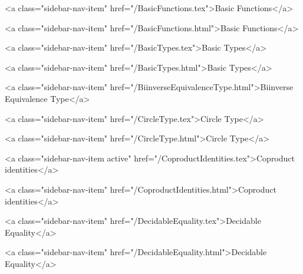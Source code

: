       
    
      
        
          <a class="sidebar-nav-item" href="/BasicFunctions.tex">Basic Functions</a>
        
      
    
      
        
          <a class="sidebar-nav-item" href="/BasicFunctions.html">Basic Functions</a>
        
      
    
      
        
          <a class="sidebar-nav-item" href="/BasicTypes.tex">Basic Types</a>
        
      
    
      
        
          <a class="sidebar-nav-item" href="/BasicTypes.html">Basic Types</a>
        
      
    
      
        
          <a class="sidebar-nav-item" href="/BiinverseEquivalenceType.html">Biinverse Equivalence Type</a>
        
      
    
      
        
          <a class="sidebar-nav-item" href="/CircleType.tex">Circle Type</a>
        
      
    
      
        
          <a class="sidebar-nav-item" href="/CircleType.html">Circle Type</a>
        
      
    
      
        
          <a class="sidebar-nav-item active" href="/CoproductIdentities.tex">Coproduct identities</a>
        
      
    
      
        
          <a class="sidebar-nav-item" href="/CoproductIdentities.html">Coproduct identities</a>
        
      
    
      
        
          <a class="sidebar-nav-item" href="/DecidableEquality.tex">Decidable Equality</a>
        
      
    
      
        
          <a class="sidebar-nav-item" href="/DecidableEquality.html">Decidable Equality</a>
        
